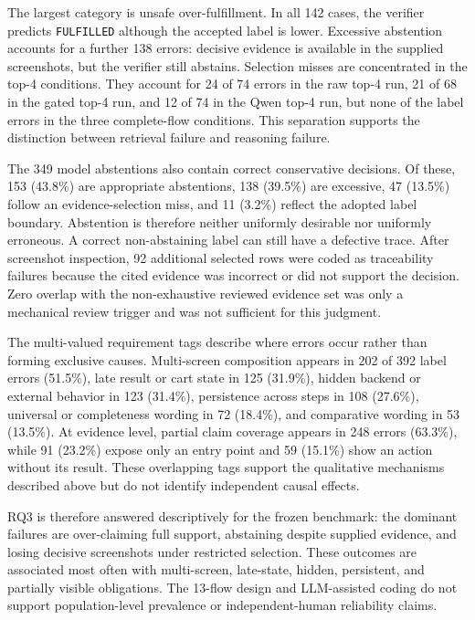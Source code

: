 The largest category is unsafe over-fulfillment. In all 142 cases, the verifier
predicts \texttt{FULFILLED} although the accepted label is lower. Excessive abstention
accounts for a further 138 errors: decisive evidence is available in the
supplied screenshots, but the verifier still abstains. Selection misses are
concentrated in the top-4 conditions. They account for 24 of 74 errors in the raw
top-4 run, 21 of 68 in the gated top-4 run, and 12 of 74 in the Qwen top-4 run,
but none of the label errors in the three complete-flow conditions. This
separation supports the distinction between retrieval failure and reasoning
failure.

The 349 model abstentions also contain correct conservative decisions. Of these,
153 (43.8\%) are appropriate abstentions, 138 (39.5\%) are excessive, 47 (13.5\%)
follow an evidence-selection miss, and 11 (3.2\%) reflect the adopted label
boundary. Abstention is therefore neither uniformly desirable nor uniformly
erroneous. A correct non-abstaining label can still have a defective trace.
After screenshot inspection, 92 additional selected rows were coded as
traceability failures because the cited evidence was incorrect or did not
support the decision. Zero overlap with the non-exhaustive reviewed evidence
set was only a mechanical review trigger and was not sufficient for this
judgment.

The multi-valued requirement tags describe where errors occur rather than
forming exclusive causes. Multi-screen composition appears in 202 of 392 label
errors (51.5\%), late result or cart state in 125 (31.9\%), hidden backend or
external behavior in 123 (31.4\%), persistence across steps in 108 (27.6\%),
universal or completeness wording in 72 (18.4\%), and comparative wording in 53
(13.5\%). At evidence level, partial claim coverage appears in 248 errors
(63.3\%), while 91 (23.2\%) expose only an entry point and 59 (15.1\%) show an
action without its result. These overlapping tags support the qualitative
mechanisms described above but do not identify independent causal effects.

RQ3 is therefore answered descriptively for the frozen benchmark: the dominant
failures are over-claiming full support, abstaining despite supplied evidence,
and losing decisive screenshots under restricted selection. These outcomes are
associated most often with multi-screen, late-state, hidden, persistent, and
partially visible obligations. The 13-flow design and LLM-assisted coding do not
support population-level prevalence or independent-human reliability claims.

